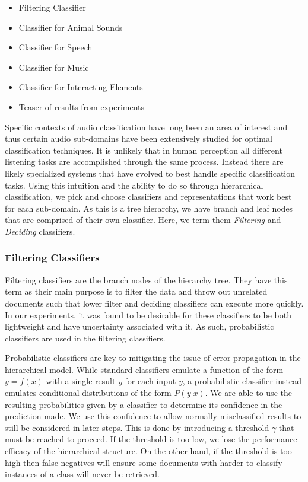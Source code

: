 \begin{itemize}
    \item Filtering Classifier
    \item Classifier for Animal Sounds
    \item Classifier for Speech
    \item Classifier for Music
    \item Classifier for Interacting Elements
    \item Teaser of results from experiments
\end{itemize}
Specific contexts of audio classification have long been an area of interest and thus certain audio sub-domains have been extensively studied for optimal classification techniques. It is unlikely that in human perception all different listening tasks are accomplished through the same process. Instead there are likely specialized systems that have evolved to best handle specific classification tasks. Using this intuition and the ability to do so through hierarchical classification, we pick and choose classifiers and representations that work best for each sub-domain. As this is a tree hierarchy, we have branch and leaf nodes that are comprised of their own classifier. Here, we term them \textit{Filtering} and \textit{Deciding} classifiers.

\subsubsection{Filtering Classifiers}
Filtering classifiers are the branch nodes of the hierarchy tree. They have this term as their main purpose is to filter the data and throw out unrelated documents such that lower filter and deciding classifiers can execute more quickly. In our experiments, it was found to be desirable for these classifiers to be both lightweight and have uncertainty associated with it. As such, probabilistic classifiers are used in the filtering classifiers. 

Probabilistic classifiers are key to mitigating the issue of error propagation in the hierarchical model. While standard classifiers emulate a function of the form $y=f(x)$ with a single result \textit{y} for each input \textit{y}, a probabilistic classifier instead emulates conditional distributions of the form $P(y|x)$. We are able to use the resulting probabilities given by a classifier to determine its confidence in the prediction made. We use this confidence to allow normally misclassified results to still be considered in later steps. This is done by introducing a threshold $\gamma$ that must be reached to proceed. If the threshold is too low, we lose the performance efficacy of the hierarchical structure. On the other hand, if the threshold is too high then false negatives will ensure some documents with harder to classify instances of a class will never be retrieved.

